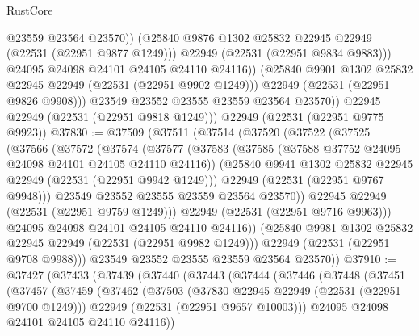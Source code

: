 \begin{lexlean}{RustCore}
\begin{coremodule}
                      @23559
                      @23564
                      @23570))
                  (@25840 @9876 @1302 @25832 @22945 @22949 (@22531 (@22951 @9877 @1249)))
                  @22949
                  (@22531 (@22951 @9834 @9883)))
                @24095
                @24098
                @24101
                @24105
                @24110
                @24116))
            (@25840 @9901 @1302 @25832 @22945 @22949 (@22531 (@22951 @9902 @1249)))
            @22949
            (@22531 (@22951 @9826 @9908)))
          @23549
          @23552
          @23555
          @23559
          @23564
          @23570))
      @22945
      @22949
      (@22531 (@22951 @9818 @1249)))
    @22949
    (@22531 (@22951 @9775 @9923))
@37830 := @37509
    (@37511
      (@37514
        (@37520
          (@37522
            (@37525
              (@37566
                (@37572
                  (@37574
                    (@37577
                      (@37583
                        (@37585 (@37588 @37752 @24095 @24098 @24101 @24105 @24110 @24116))
                        (@25840 @9941 @1302 @25832 @22945 @22949 (@22531 (@22951 @9942 @1249)))
                        @22949
                        (@22531 (@22951 @9767 @9948)))
                      @23549
                      @23552
                      @23555
                      @23559
                      @23564
                      @23570))
                  @22945
                  @22949
                  (@22531 (@22951 @9759 @1249)))
                @22949
                (@22531 (@22951 @9716 @9963)))
              @24095
              @24098
              @24101
              @24105
              @24110
              @24116))
          (@25840 @9981 @1302 @25832 @22945 @22949 (@22531 (@22951 @9982 @1249)))
          @22949
          (@22531 (@22951 @9708 @9988)))
        @23549
        @23552
        @23555
        @23559
        @23564
        @23570))
@37910 := @37427
    (@37433
      (@37439
        (@37440
          (@37443
            (@37444
              (@37446
                (@37448
                  (@37451
                    (@37457
                      (@37459
                        (@37462
                          (@37503
                            (@37830 @22945 @22949 (@22531 (@22951 @9700 @1249)))
                            @22949
                            (@22531 (@22951 @9657 @10003)))
                          @24095
                          @24098
                          @24101
                          @24105
                          @24110
                          @24116))

\end{coremodule}
\end{lexlean}
